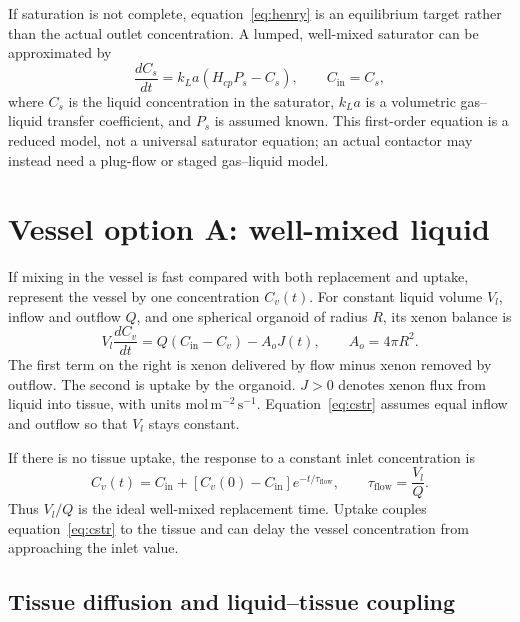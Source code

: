 \documentclass[11pt]{article}
\begin{document}
If saturation is not complete, equation~\eqref{eq:henry} is an equilibrium
target rather than the actual outlet concentration. A lumped, well-mixed
saturator can be approximated by
\begin{equation}
  \frac{dC_s}{dt}
  = k_La\left(H_{cp}P_s-C_s\right),
  \qquad C_{\mathrm{in}}=C_s,
  \label{eq:saturator}
\end{equation}
where \(C_s\) is the liquid concentration in the saturator, \(k_La\) is a
volumetric gas--liquid transfer coefficient, and \(P_s\) is assumed known.
This first-order equation is a reduced model, not a universal saturator
equation; an actual contactor may instead need a plug-flow or staged
gas--liquid model.

\section{Vessel option A: well-mixed liquid}

If mixing in the vessel is fast compared with both replacement and uptake,
represent the vessel by one concentration \(C_v(t)\). For constant liquid
volume \(V_l\), inflow and outflow \(Q\), and one spherical organoid of
radius \(R\), its xenon balance is
\begin{equation}
  V_l\frac{dC_v}{dt}
  = Q\left(C_{\mathrm{in}}-C_v\right)
    - A_o J(t),
  \qquad A_o=4\pi R^2.
  \label{eq:cstr}
\end{equation}
The first term on the right is xenon delivered by flow minus xenon removed
by outflow. The second is uptake by the organoid. \(J>0\) denotes xenon flux
from liquid into tissue, with units \(\mathrm{mol\,m^{-2}\,s^{-1}}\).
Equation~\eqref{eq:cstr} assumes equal inflow and outflow so that \(V_l\)
stays constant.

If there is no tissue uptake, the response to a constant inlet concentration
is
\begin{equation}
  C_v(t)=C_{\mathrm{in}}+
  \left[C_v(0)-C_{\mathrm{in}}\right]e^{-t/\tau_{\mathrm{flow}}},
  \qquad \tau_{\mathrm{flow}}=\frac{V_l}{Q}.
  \label{eq:replacement}
\end{equation}
Thus \(V_l/Q\) is the ideal well-mixed replacement time. Uptake couples
equation~\eqref{eq:cstr} to the tissue and can delay the vessel concentration
from approaching the inlet value.

\subsection{Tissue diffusion and liquid--tissue coupling}
\end{document}
